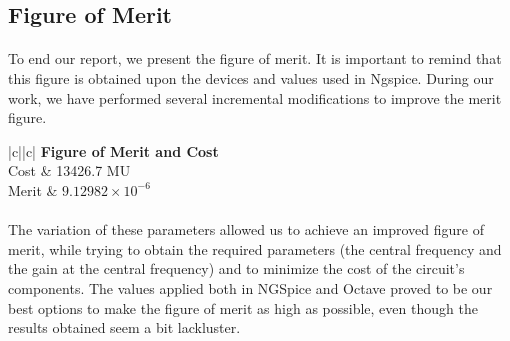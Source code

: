 \subsection{Figure of Merit}
\label{subsec:Figure_of_Merit}


\paragraph{}
To end our report, we present the figure of merit. It is important to remind that this figure is obtained upon the devices and values used in Ngspice. During our work, we have performed several incremental modifications to improve the merit figure.

\begin{center}
   \begin{tabular}{|c||c|}
      \hline    
       {\bf Figure of Merit and Cost} \\
      \hline
      Cost & 13426.7 MU \\ \hline
      Merit & $9.12982 \times 10^{-6}$ \\ \hline
   \end{tabular}
 \end{center}
 
\paragraph{}
The variation of these parameters allowed us to achieve an improved figure of merit, while trying to obtain the required parameters (the central frequency and the gain at the central frequency) and to minimize the cost of the circuit's components. The values applied both in NGSpice and Octave proved to be our best options to make the figure of merit as high as possible, even though the results obtained seem a bit lackluster.
